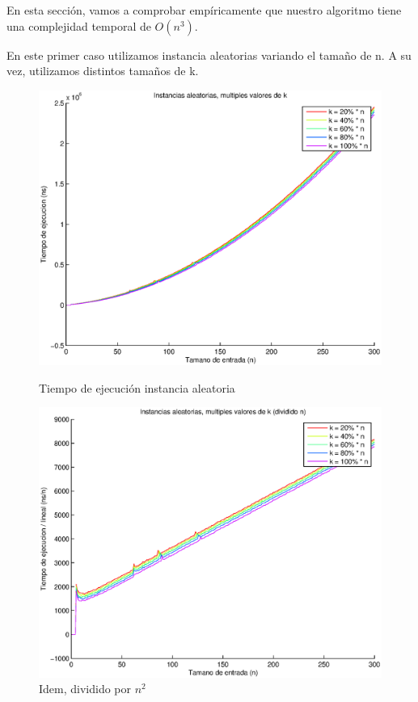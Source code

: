 En esta sección, vamos a comprobar empíricamente que nuestro algoritmo tiene una complejidad temporal de $O(n^3)$.

En este primer caso utilizamos instancia aleatorias variando el tamaño de n. A su vez, utilizamos distintos tamaños de k.

\begin{figure}[H]
  \begin{minipage}{0.5\linewidth}
    \includegraphics[width=\linewidth]{img/problema2/instancia_aleatoria_varios_k.eps}
    \caption{Tiempo de ejecución instancia aleatoria}\label{fig:problema2-k}
  \end{minipage}
  \hfill
  \begin{minipage}{0.5\linewidth}
    \includegraphics[width=\linewidth]{img/problema2/instancia_aleatoria_varios_k_div_n.eps}
    \caption{Idem, dividido por $n^2$}\label{fig:problema2-k-n}
  \end{minipage}
\end{figure}


